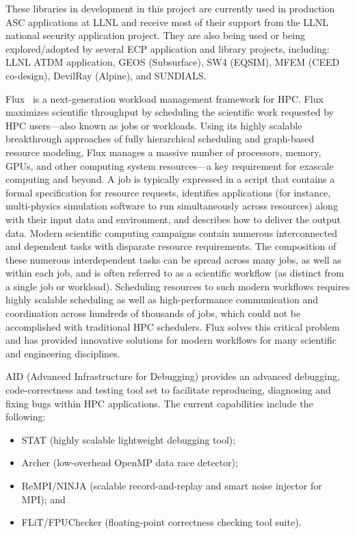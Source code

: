 These libraries in development in this project are currently used in
production ASC applications at
LLNL and receive most of their support from the LLNL national security
application project. They are also being used or being explored/adopted
by several ECP application and library projects, including: LLNL ATDM
application, GEOS (Subsurface), SW4 (EQSIM), MFEM (CEED co-design),
DevilRay (Alpine), and SUNDIALS.

Flux~\cite{flux,flux-fgcs:2020} is a next-generation workload management
framework for HPC. Flux maximizes scientific throughput
by scheduling the scientific work requested by HPC users--–also
known as jobs or workloads.  Using its highly scalable
breakthrough approaches of fully hierarchical scheduling and
graph-based resource modeling, Flux manages a massive number
of processors, memory, GPUs, and other computing system
resources--–a key requirement for exascale computing and beyond.
A job is typically expressed in a script that contains
a formal specification for resource requests, identifies
applications (for instance, multi-physics simulation software
to run simultaneously across resources) along with their
input data and environment, and describes how to deliver
the output data. Modern scientific computing campaigns
contain numerous interconnected and dependent tasks with
disparate resource requirements.
The composition of these
numerous interdependent tasks can be spread across many jobs,
as well as within each job, and is often referred to as a scientific
workflow (as distinct from a single job or workload). Scheduling
resources to such modern workflows requires highly scalable
scheduling as well as high-performance communication and coordination
across hundreds of thousands of jobs, which could not be
accomplished with traditional HPC schedulers. Flux solves this
critical problem and has provided innovative solutions
for modern workflows for many scientific and engineering
disciplines.


AID (Advanced Infrastructure for Debugging) provides an advanced
debugging, code-correctness and testing tool set to facilitate
reproducing, diagnosing and fixing bugs within HPC applications. The
current capabilities include the following:

\begin{itemize}
\item STAT (highly scalable lightweight debugging tool);
\item Archer (low-overhead OpenMP data race detector);
\item ReMPI/NINJA (scalable record-and-replay and smart noise injector for MPI); and
\item FLiT/FPUChecker (floating-point correctness checking tool suite).
\end{itemize}

